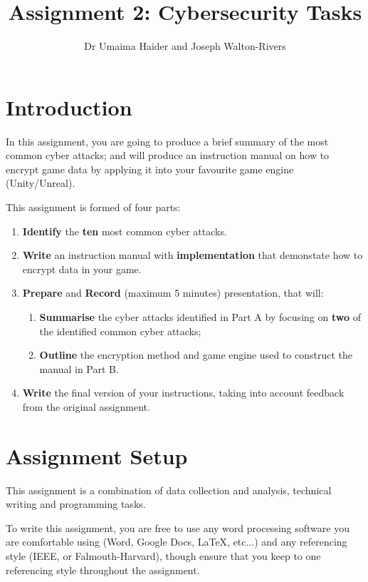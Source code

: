\documentclass{../../fal_assignment}
\title{Assignment 2: Cybersecurity Tasks}
\author{Dr Umaima Haider and Joseph Walton-Rivers}
\begin{document}
\maketitle

\section*{Introduction}

\begin{marginquote}
  
            
\end{marginquote}

In this assignment, you are going to produce a brief summary of the most common cyber attacks; and will produce an instruction manual on how to encrypt game data by applying it into your favourite game engine (Unity/Unreal).

This assignment is formed of four parts:
\begin{enumerate}[label=(\Alph*)]
 \item \textbf{Identify} the \textbf{ten} most common cyber attacks.
 \item \textbf{Write} an instruction manual with \textbf{implementation} that demonstate how to encrypt data in your game.
 \item \textbf{Prepare} and \textbf{Record} (maximum 5 minutes) presentation, that will: \begin{enumerate}
   \item \textbf{Summarise} the cyber attacks identified in Part A by focusing on \textbf{two} of the identified common cyber attacks;
   \item \textbf{Outline} the encryption method and game engine used to construct the manual in Part B. \end{enumerate}
 \item \textbf{Write} the final version of your instructions, taking into account feedback from the original assignment.
\end{enumerate}

\section*{Assignment Setup}
This assignment is a combination of data collection and analysis, technical writing and programming tasks.

To write this assignment, you are free to use any word processing software you are comfortable using (Word, Google Docs, \LaTeX{}, etc...) and any referencing style (IEEE, or Falmouth-Harvard), though ensure that you keep to one referencing style throughout the assignment.
\end{document}
